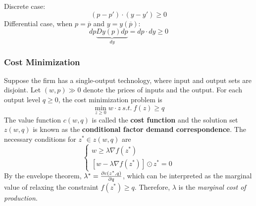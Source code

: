 \documentclass{report}
\begin{document}
	 		\begin{proposition}
	 			Discrete case:
	 			\begin{equation}
	 				(p-p') \cdot (y-y') \geq 0
	 			\end{equation}
	 			Differential case, when $p = \overline{p}$ and $y = y(\overline{p})$:
	 			\begin{equation}
	 				dp \underbrace{Dy(p) dp}_{dy} = dp \cdot dy \geq 0
	 			\end{equation}
	 		\end{proposition}
	 		
	 		\subsubsection{Cost Minimization}
	 		\begin{definition}[CMP]
	 			Suppose the firm has a single-output technology, where input and output sets are disjoint. Let $(w, p) \gg 0$ denote the prices of inputs and the output. For each output level $q \geq 0$, the cost minimization problem is 
	 			\begin{equation}
	 				\min_{z \geq 0} w \cdot z\ s.t.\ f(z) \geq q
	 			\end{equation}
	 			The value function $c(w, q)$ is called the \textbf{cost function} and the solution set $z(w, q)$ is known as the \textbf{conditional factor demand correspondence}. The necessary conditions for $z^* \in z(w, q)$ are
	 			\begin{equation}
	 				\begin{cases}
	 					w \geq \lambda \nabla f(z^*) \\
	 					\left[w - \lambda \nabla f(z^*) \right] \odot z^* = 0
	 				\end{cases}
	 			\end{equation}
	 			By the envelope theorem, $\lambda^* = \frac{\partial{c(z^*, q)}}{\partial{q}}$, which can be interpreted as the marginal value of relaxing the constraint $f(z^*) \geq q$. Therefore, $\lambda$ is the \emph{marginal cost of production}.
	 		\end{definition}
	 		
\end{document}
